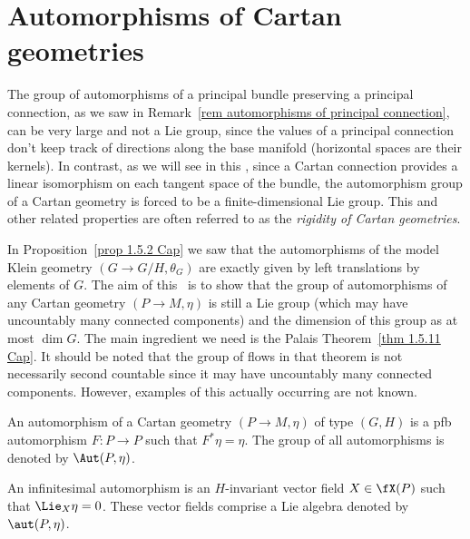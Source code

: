 \section{Automorphisms of Cartan geometries}

The group of automorphisms of a principal bundle preserving a principal connection, as we saw in Remark~\ref{rem automorphisms of principal connection}, can be very large and not a Lie group, since the values of a principal connection don't keep track of directions along the base manifold (horizontal spaces are their kernels). In contrast, as we will see in this \sect, since a Cartan connection provides a linear isomorphism on each tangent space of the bundle, the automorphism group of a Cartan geometry is forced to be a finite-dimensional Lie group. This and other related properties are often referred to as the \emph{rigidity of Cartan geometries}.

In Proposition~\ref{prop 1.5.2 Cap} we saw that the automorphisms of the model Klein geometry $(G\to G\slash H,\theta_G)$ are exactly given by left translations by elements of $G$. The aim of this \sect\ is to show that the group of automorphisms of any Cartan geometry $(P\to M,\eta)$ is still a Lie group (which may have uncountably many connected components) and the dimension of this group as at most $\dim G$. The main ingredient we need is the Palais Theorem~\ref{thm 1.5.11 Cap}. It should be noted that the group of flows in that theorem is not necessarily second countable since it may have uncountably many connected components. However, examples of this actually occurring are not known. 

\begin{defn}
    An automorphism of a Cartan geometry $(P\to M,\eta)$ of type $(G,H)$ is a \gls{pfb} automorphism $F:P\to P$ such that $F^\ast\eta=\eta$. The group of all automorphisms is denoted by $\Aut(P,\eta)$. 
    
    An infinitesimal automorphism is an $H$-invariant vector field $X\in\fX(P)$ such that $\Lie_X \eta=0$. These vector fields comprise a Lie algebra denoted by $\aut(P,\eta)$.
\end{defn}


